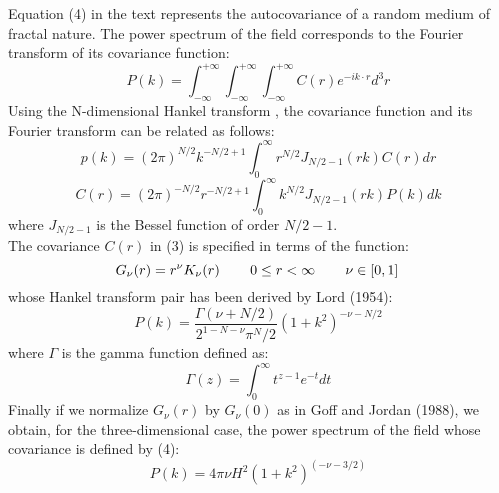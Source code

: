 
Equation (4) in the text represents the autocovariance of a random medium
of fractal nature. The power spectrum of the field corresponds to 
the Fourier transform of its covariance function:
\begin{equation}
P(k)=\int_{-\infty}^{+\infty}\int_{-\infty}^{+\infty}\int_{-\infty}^{+\infty} C(r)e^{-ik\cdot r} d^3r \
\label {eqA1}
\end{equation}
Using the N-dimensional Hankel transform \cite{lord}, the covariance function
and its Fourier transform can be related as follows:
\begin{equation}
p(k)=(2\pi)^{N/2}k^{-N/2+1}\int_{0}^{\infty} r^{N/2}J_{N/2-1}(rk)C(r)dr \
\label {eqA2}
\end{equation}
\begin{equation}
C(r)=(2\pi)^{-N/2}r^{-N/2+1}\int_{0}^{\infty} k^{N/2}J_{N/2-1}(rk)P(k)dk \
\label {eqA3}
\end{equation}
where $J_{N/2-1}$ is the Bessel function of order $N/2-1$.\\
The covariance $C(r)$ in (3) is specified in terms of the function:
\begin{equation}
G_\nu (r)=r^\nu K_\nu (r) \hspace{.3in} 0\leq r < \infty \hspace{.3in} \nu \in [0,1]\ 
\label {eqA4}
\end{equation} 
whose Hankel transform pair has been derived by Lord (1954):
\begin{equation} 
P(k)=\frac {\Gamma{(\nu +N/2)}} {2^{1-N-\nu}\pi{^N/2}} {(1+k^2)}^{-\nu-N/2} \ 
\label {eqA5} 
\end{equation}
where $\Gamma$ is the gamma function defined as:
\begin{equation}
\Gamma (z)= \int_{0}^{\infty} t^{z-1}e^{-t} dt \
\label {eqA6}
\end{equation}
Finally if we normalize $G_\nu (r)$ by $G_\nu (0)$ as in Goff and Jordan (1988), we 
obtain, for the three-dimensional case, the power spectrum of the field 
whose covariance is defined by (4):
\begin{equation}
P(k)=4\pi\nu H^2 {(1+k^2)}^{(-\nu-3/2)} \
\label {eqA7}
\end{equation}

\putbib[SEP,../nizar2/random]

